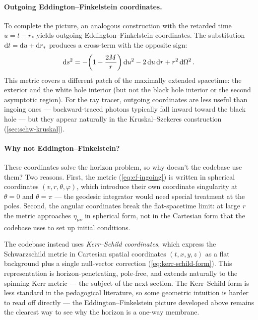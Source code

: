 \paragraph{Outgoing Eddington--Finkelstein coordinates.}

To complete the picture, an analogous construction with the retarded
time $u = t - r_*$ yields outgoing Eddington--Finkelstein coordinates.
The substitution $\mathrm{d} t = \mathrm{d} u + \mathrm{d} r_*$ produces a cross-term with the
opposite sign:
%
\begin{equation}
  \mathrm{d} s^2 = -\!\left(1 - \frac{2M}{r}\right)\mathrm{d} u^2
           - 2\,\mathrm{d} u\,\mathrm{d} r
           + r^2\,\mathrm{d}\Omega^2 \,.
  \label{eq:ef-outgoing}
\end{equation}
%
This metric covers a different patch of the maximally extended
spacetime: the exterior and the white hole interior (but not the
black hole interior or the second asymptotic region).  For the ray
tracer, outgoing coordinates are less useful than ingoing ones ---
backward-traced photons typically fall inward toward the black hole ---
but they appear naturally in the Kruskal--Szekeres construction
(\cref{sec:schw-kruskal}).

\paragraph{Why not Eddington--Finkelstein?}

These coordinates solve the horizon problem, so why doesn't the
codebase use them?  Two reasons.  First, the
metric (\cref{eq:ef-ingoing}) is written in spherical coordinates
$(v, r, \theta, \varphi)$, which introduce their own coordinate
singularity at $\theta = 0$ and $\theta = \pi$ --- the geodesic
integrator would need special treatment at the poles.  Second, the
angular coordinates break the flat-spacetime limit: at large $r$ the
metric approaches $\eta_{\mu\nu}$ in spherical form, not in the
Cartesian form that the codebase uses to set up initial conditions.

The codebase instead uses \emph{Kerr--Schild coordinates}, which
express the Schwarzschild metric in Cartesian spatial coordinates
$(t, x, y, z)$ as a flat background plus a single null-vector
correction (\cref{eq:kerr-schild-form}).  This representation is
horizon-penetrating, pole-free, and extends naturally to the
spinning Kerr metric --- the subject of the next section.
The Kerr--Schild form is less standard in the pedagogical literature,
so some geometric intuition is harder to read off directly ---
the Eddington--Finkelstein picture developed above remains the
clearest way to see why the horizon is a one-way membrane.
